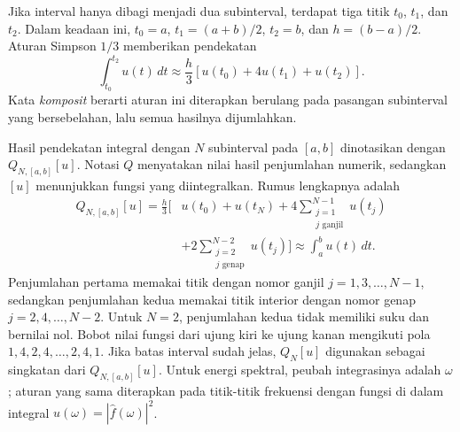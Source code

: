\documentclass[11pt,a4paper]{article}
\begin{document}
Jika interval hanya dibagi menjadi dua subinterval, terdapat tiga titik
$t_0$, $t_1$, dan $t_2$. Dalam keadaan ini, $t_0=a$, $t_1=(a+b)/2$,
$t_2=b$, dan $h=(b-a)/2$. Aturan Simpson $1/3$ memberikan pendekatan
\[
 \int_{t_0}^{t_2}u(t)\,dt\approx
 \frac h3\left[u(t_0)+4u(t_1)+u(t_2)\right].
\]
Kata \emph{komposit} berarti aturan ini diterapkan berulang pada pasangan
subinterval yang bersebelahan, lalu semua hasilnya dijumlahkan.

Hasil pendekatan integral dengan $N$ subinterval pada $[a,b]$ dinotasikan
 dengan $Q_{N,[a,b]}[u]$. Notasi $Q$ menyatakan nilai hasil penjumlahan
numerik, sedangkan $[u]$ menunjukkan fungsi yang diintegralkan.
Rumus lengkapnya adalah
\begin{equation}
 \begin{aligned}
 Q_{N,[a,b]}[u]=\frac h3\Bigg[&u(t_0)+u(t_N)
 +4\!\sum_{\substack{j=1\\j\text{ ganjil}}}^{N-1}u(t_j)\\
 &+2\!\sum_{\substack{j=2\\j\text{ genap}}}^{N-2}u(t_j)\Bigg]
 \approx\int_a^b u(t)\,dt.
 \end{aligned}
 \label{eq:simpson}
\end{equation}
Penjumlahan pertama memakai titik dengan nomor ganjil $j=1,3,\ldots,N-1$,
sedangkan penjumlahan kedua memakai titik interior dengan nomor genap
$j=2,4,\ldots,N-2$. Untuk $N=2$, penjumlahan kedua tidak memiliki suku
dan bernilai nol. Bobot nilai fungsi dari ujung kiri ke ujung kanan
mengikuti pola $1,4,2,4,\ldots,2,4,1$.
Jika batas interval sudah jelas, $Q_N[u]$ digunakan sebagai singkatan
dari $Q_{N,[a,b]}[u]$. Untuk energi spektral, peubah integrasinya adalah
$\omega$; aturan yang sama diterapkan pada titik-titik frekuensi dengan
fungsi di dalam integral $u(\omega)=|\widehat f(\omega)|^2$.
\end{document}
